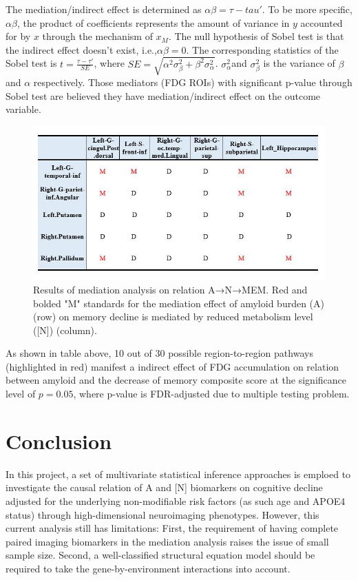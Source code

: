 \documentclass{article}
\begin{document}
The mediation/indirect effect is determined as $\alpha\beta=\tau-tau'$. To be more specific, $\alpha\beta$, the product of coefficients represents the amount of variance in $y$ accounted for by $x$ through the mechanism of $x_M$. The null hypothesis of Sobel test is that the indirect effect doesn’t exist, i.e.,$\alpha\beta=0$. The corresponding statistics of the Sobel test is $t=\frac{\tau-\tau'}{SE}$, where $SE=\sqrt{\alpha^2\sigma^2_{\beta}+\beta^2\sigma^2_{\alpha}}$. $\sigma^2_{\alpha}$and $\sigma^2_{\beta}$ is the variance of $\beta$ and $\alpha$ respectively. Those mediators (FDG ROIs) with significant p-value through Sobel test are believed they have mediation/indirect effect on the outcome variable. 
\begin{figure}[t]
         \centering
         \includegraphics[scale=0.6]{Mediation_Results.jpg}
         \caption{Results of mediation analysis on relation A→N→MEM. Red and bolded "M" standards for the mediation effect of amyloid burden (A) (row) on memory decline is mediated by reduced metabolism level ([N]) (column).}
\end{figure}
As shown in table above, 10 out of 30 possible region-to-region pathways (highlighted in red) manifest a indirect effect of FDG accumulation on relation between amyloid and the decrease of memory composite score at the significance level of $p = 0.05$, where p-value is FDR-adjusted due to multiple testing problem.
\section{Conclusion}
In this project, a set of multivariate statistical inference approaches is emploed to investigate the causal relation of A and [N] biomarkers on cognitive decline adjusted for the underlying non-modifiable risk factors (as such age and APOE4 status) through high-dimensional neuroimaging phenotypes. However, this current analysis still has limitations: First, the requirement of having complete paired imaging biomarkers in the mediation analysis raises the issue of small sample size. Second, a well-classified structural equation model should be required to take the gene-by-environment interactions into account. 
\end{document}
